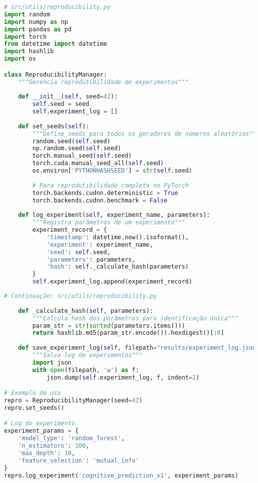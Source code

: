 \begin{pythonbox}
\begin{lstlisting}[language=Python]
# src/utils/reproducibility.py
import random
import numpy as np
import pandas as pd
import torch
from datetime import datetime
import hashlib
import os

class ReproducibilityManager:
    """Gerencia reprodutibilidade de experimentos"""
    
    def __init__(self, seed=42):
        self.seed = seed
        self.experiment_log = []
        
    def set_seeds(self):
        """Define seeds para todos os geradores de números aleatórios"""
        random.seed(self.seed)
        np.random.seed(self.seed)
        torch.manual_seed(self.seed)
        torch.cuda.manual_seed_all(self.seed)
        os.environ['PYTHONHASHSEED'] = str(self.seed)
        
        # Para reprodutibilidade completa no PyTorch
        torch.backends.cudnn.deterministic = True
        torch.backends.cudnn.benchmark = False
        
    def log_experiment(self, experiment_name, parameters):
        """Registra parâmetros de um experimento"""
        experiment_record = {
            'timestamp': datetime.now().isoformat(),
            'experiment': experiment_name,
            'seed': self.seed,
            'parameters': parameters,
            'hash': self._calculate_hash(parameters)
        }
        self.experiment_log.append(experiment_record)
\end{lstlisting}
\end{pythonbox}

\newpage

\begin{pythonbox}
\begin{lstlisting}[language=Python]
# Continuação: src/utils/reproducibility.py
        
    def _calculate_hash(self, parameters):
        """Calcula hash dos parâmetros para identificação única"""
        param_str = str(sorted(parameters.items()))
        return hashlib.md5(param_str.encode()).hexdigest()[:8]
    
    def save_experiment_log(self, filepath="results/experiment_log.json"):
        """Salva log de experimentos"""
        import json
        with open(filepath, 'w') as f:
            json.dump(self.experiment_log, f, indent=2)

# Exemplo de uso
repro = ReproducibilityManager(seed=42)
repro.set_seeds()

# Log do experimento
experiment_params = {
    'model_type': 'random_forest',
    'n_estimators': 100,
    'max_depth': 10,
    'feature_selection': 'mutual_info'
}
repro.log_experiment('cognitive_prediction_v1', experiment_params)
\end{lstlisting}
\end{pythonbox}

